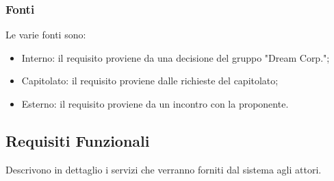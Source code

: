     
    \subsubsection{Fonti}
    Le varie fonti sono:
        \begin{itemize}
            \item Interno: il requisito proviene da una decisione del gruppo "Dream Corp.";
            \item Capitolato: il requisito proviene dalle richieste del capitolato;
            \item Esterno: il requisito proviene da un incontro con la proponente.
        \end{itemize}
    
		\subsection{Requisiti Funzionali}			
        Descrivono in dettaglio i servizi che verranno forniti dal sistema agli attori.
